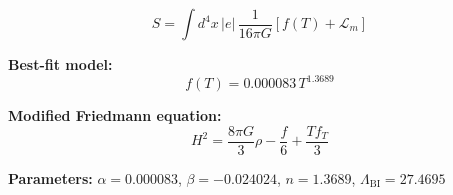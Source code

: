 
\begin{equation}
  S = \int d^4x \, |e| \, \frac{1}{16\pi G} \left[ f(T) + \mathcal{L}_m \right]
\end{equation}

\textbf{Best-fit model:}
\begin{equation}
  f(T) = 0.000083 \, T^{1.3689}
\end{equation}

\textbf{Modified Friedmann equation:}
\begin{equation}
  H^2 = \frac{8\pi G}{3} \rho - \frac{f}{6} + \frac{T f_T}{3}
\end{equation}

\textbf{Parameters:}
$\alpha = 0.000083$, \quad
$\beta = -0.024024$, \quad
$n = 1.3689$, \quad
$\Lambda_{\text{BI}} = 27.4695$